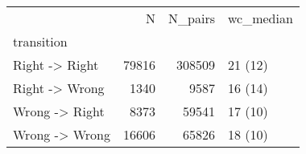\begin{tabular}{lrrl}
\toprule
{} &      N &  N\_pairs & wc\_median \\
transition     &        &          &           \\
\midrule
Right -> Right &  79816 &   308509 &   21 (12) \\
Right -> Wrong &   1340 &     9587 &   16 (14) \\
Wrong -> Right &   8373 &    59541 &   17 (10) \\
Wrong -> Wrong &  16606 &    65826 &   18 (10) \\
\bottomrule
\end{tabular}
